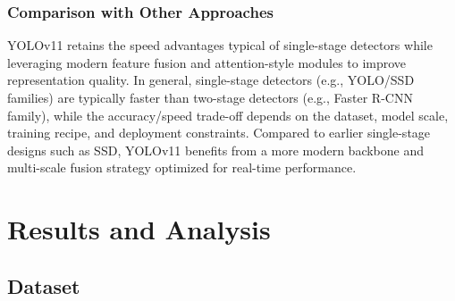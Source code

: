 \documentclass[conference]{IEEEtran}
\begin{document}
\subsubsection{Comparison with Other Approaches}
YOLOv11 retains the speed advantages typical of single-stage detectors while leveraging modern feature fusion and attention-style modules to improve representation quality. In general, single-stage detectors (e.g., YOLO/SSD families) are typically faster than two-stage detectors (e.g., Faster R-CNN family), while the accuracy/speed trade-off depends on the dataset, model scale, training recipe, and deployment constraints. Compared to earlier single-stage designs such as SSD, YOLOv11 benefits from a more modern backbone and multi-scale fusion strategy optimized for real-time performance.

\section{Results and Analysis}
\label{sec:results}

\subsection{Dataset}




\end{document}
